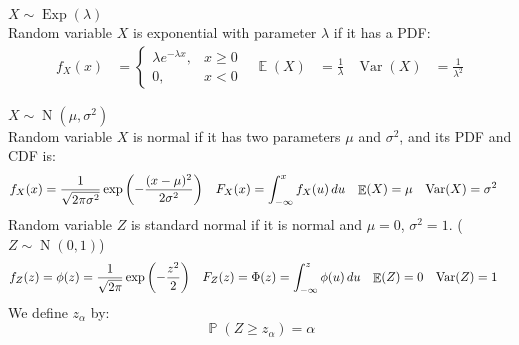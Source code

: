 \documentclass{huhtakm-template-book-v2}
\DeclareMathOperator{\prob}{\mathbb{P}}
\DeclareMathOperator{\E}{\mathbb{E}}
\DeclareMathOperator{\Var}{Var}
\DeclareMathOperator{\Exp}{Exp}
\DeclareMathOperator{\N}{N}
\begin{document}
\begin{eg} $X\sim\Exp(\lambda)$\\
	Random variable $X$ is exponential with parameter $\lambda$ if it has a PDF:
	\begin{align*}
		f_{X}(x)&=\begin{cases}
			\lambda e^{-\lambda x}, &x\geq 0\\
			0, &x<0
		\end{cases} & \E(X)&=\frac{1}{\lambda} & \Var(X)&=\frac{1}{\lambda^{2}}
	\end{align*}
\end{eg}
\begin{eg} $X\sim\N(\mu,\sigma^{2})$\\
	Random variable $X$ is normal if it has two parameters $\mu$ and $\sigma^{2}$, and its PDF and CDF is:
	\begin{align*}
		f_{X}(x)&=\frac{1}{\sqrt{2\pi\sigma^{2}}}\exp\left(-\frac{(x-\mu)^{2}}{2\sigma^{2}}\right) & F_{X}(x)&=\intlu{-\infty}{x}f_{X}(u)\,du & \E(X)&=\mu & \Var(X)&=\sigma^{2}
	\end{align*}
	Random variable $Z$ is standard normal if it is normal and $\mu=0$, $\sigma^{2}=1$. ($Z\sim\N(0,1)$)
	\begin{align*}
		f_{Z}(z)&=\phi(z)=\frac{1}{\sqrt{2\pi}}\exp\left(-\frac{z^{2}}{2}\right) & F_{Z}(z)&=\Phi(z)=\intlu{-\infty}{z}\phi(u)\,du & \E(Z)&=0 & \Var(Z)&=1
	\end{align*}
	We define $z_{\alpha}$ by:
	\begin{equation*}
		\prob(Z\geq z_{\alpha})=\alpha
	\end{equation*}
\end{eg}
\end{document}
